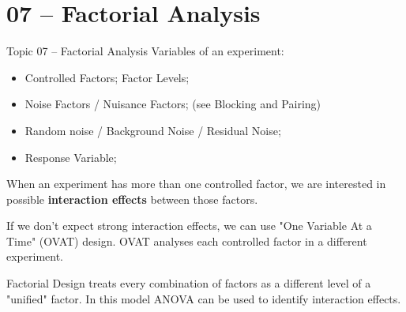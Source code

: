 \section{07 -- Factorial Analysis}

\begin{frame}[t]{Topic 07 -- Factorial Analysis}
  Variables of an experiment:
  \begin{itemize}
    \item Controlled Factors; Factor Levels;
    \item Noise Factors / Nuisance Factors; (see Blocking and Pairing)
    \item Random noise / Background Noise / Residual Noise;
    \item Response Variable;
  \end{itemize}\bigskip

  When an experiment has more than one controlled factor, we are interested in possible {\bf interaction effects} between those factors.\bigskip

  If we don't expect strong interaction effects, we can use "One Variable At a Time" (OVAT) design. OVAT analyses each controlled factor in a different experiment.\bigskip

  Factorial Design treats every combination of factors as a different level of a "unified" factor. In this model ANOVA can be used to identify interaction effects.
\end{frame}
